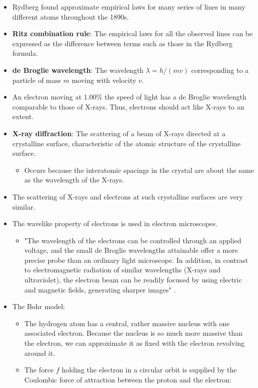 \documentclass[../notes.tex]{subfiles}
\begin{document}
\begin{itemize}
\begin{table}[h!]
    \end{table}
    \item Rydberg found approximate empirical laws for many series of lines in many different atoms throughout the 1890s.
    \item \textbf{Ritz combination rule}: The empirical laws for all the observed lines can be expressed as the difference between terms such as those in the Rydberg formula.
    \item \textbf{de Broglie wavelength}: The wavelength $\lambda=h/(mv)$ corresponding to a particle of mass $m$ moving with velocity $v$.
    \item An electron moving at $1.00\%$ the speed of light has a de Broglie wavelength comparable to those of X-rays. Thus, electrons should act like X-rays to an extent.
    \item \textbf{X-ray diffraction}: The scattering of a beam of X-rays directed at a crystalline surface, characteristic of the atomic structure of the crystalline surface.
    \begin{itemize}
        \item Occurs because the interatomic spacings in the crystal are about the same as the wavelength of the X-rays.
    \end{itemize}
    \item The scattering of X-rays and electrons at such crystalline surfaces are very similar.
    \item The wavelike property of electrons is used in electron microscopes.
    \begin{itemize}
        \item "The wavelength of the electrons can be controlled through an applied voltage, and the small de Broglie wavelengths attainable offer a more precise probe than an ordinary light microscope. In addition, in contrast to electromagnetic radiation of similar wavelengths (X-rays and ultraviolet), the electron beam can be readily focused by using electric and magnetic fields, generating sharper images" \parencite[18]{bib:McQuarrieSimon}.
    \end{itemize}
    \item The Bohr model:
    \begin{itemize}
        \item The hydrogen atom has a central, rather massive nucleus with one associated electron. Because the nucleus is so much more massive than the electron, we can approximate it as fixed with the electron revolving around it.
        \item The force $f$ holding the electron in a circular orbit is supplied by the Coulombic force of attraction between the proton and the electron:

\end{itemize}
\end{itemize}
\end{document}
